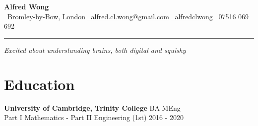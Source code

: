 \documentclass[letterpaper, 10pt]{article}
\begin{document}
\begin{center}
	{\bfseries\huge Alfred Wong}\\
        \vspace{.5\baselineskip}
        \small
	\faMapMarker\ Bromley-by-Bow, London
	\quad
	\href{mailto:alfred.cl.wong@gmail.com}{{\small\faEnvelope}\ alfred.cl.wong@gmail.com}
	\quad
	\href{https://github.com/alfredclwong}{\faGithub\ alfredclwong}
	\quad
	\faPhone\ 07516 069 692
	\vspace{-.5\baselineskip}\rule{\textwidth}{0.8pt}
\end{center}

\begin{center}    
\textit{Excited about understanding brains, both digital  and squishy }
\end{center}

\section*{Education}
\textbf{University of Cambridge, Trinity College} \hfill BA MEng\\
Part I Mathematics - Part II Engineering (1st) \hfill 2016 - 2020
\end{document}
